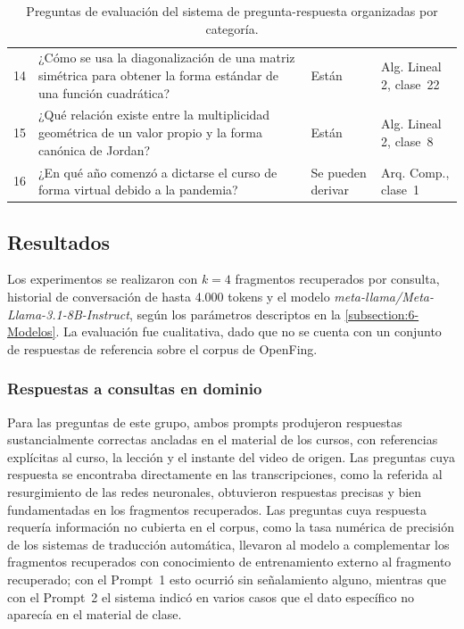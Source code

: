 \begin{table}[H]
\begin{tabular}{c p{8.0cm} p{2.2cm} p{2.2cm}}
14 & ¿Cómo se usa la diagonalización de una matriz simétrica para obtener la forma estándar de una función cuadrática? & Están & Alg. Lineal 2, clase~22 \\
15 & ¿Qué relación existe entre la multiplicidad geométrica de un valor propio y la forma canónica de Jordan? & Están & Alg. Lineal 2, clase~8 \\
16 & ¿En qué año comenzó a dictarse el curso de forma virtual debido a la pandemia? & Se pueden derivar & \multicolumn{1}{p{3cm}}{Arq. Comp., clase~1} \\
\bottomrule
\end{tabular}
\caption{Preguntas de evaluación del sistema de pregunta-respuesta organizadas por categoría.}
\label{table:preguntas_evaluacion}
\end{table}

\subsection{Resultados}
\label{subsection:6-QA-Resultados}

Los experimentos se realizaron con $k=4$ fragmentos recuperados por consulta, historial de conversación de hasta 4.000 tokens y el modelo \textit{meta-llama/Meta-Llama-3.1-8B-Instruct}, según los parámetros descriptos en la \autoref{subsection:6-Modelos}. La evaluación fue cualitativa, dado que no se cuenta con un conjunto de respuestas de referencia sobre el corpus de OpenFing.

\subsubsection{Respuestas a consultas en dominio}

Para las preguntas de este grupo, ambos prompts produjeron respuestas sustancialmente correctas ancladas en el material de los cursos, con referencias explícitas al curso, la lección y el instante del video de origen. Las preguntas cuya respuesta se encontraba directamente en las transcripciones, como la referida al resurgimiento de las redes neuronales, obtuvieron respuestas precisas y bien fundamentadas en los fragmentos recuperados. Las preguntas cuya respuesta requería información no cubierta en el corpus, como la tasa numérica de precisión de los sistemas de traducción automática, llevaron al modelo a complementar los fragmentos recuperados con conocimiento de entrenamiento externo al fragmento recuperado; con el Prompt~1 esto ocurrió sin señalamiento alguno, mientras que con el Prompt~2 el sistema indicó en varios casos que el dato específico no aparecía en el material de clase.

